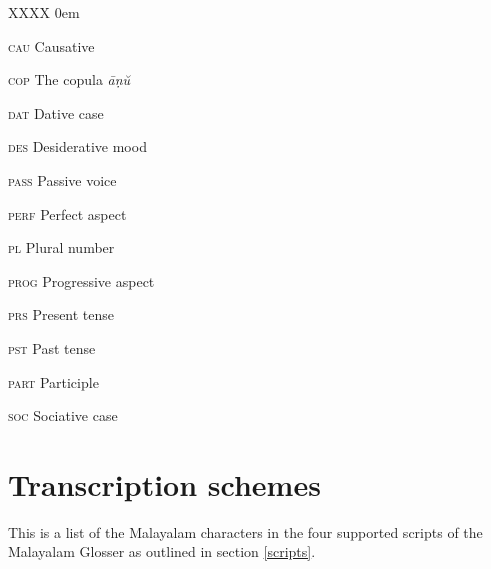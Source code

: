 \documentclass[a4paper]{article}
\begin{document}
\begin{multicols}{2}
\begin{labeling}{XXXX}
\itemsep0em
\item [\textsc{cau}] Causative
\item [\textsc{cop}] The copula \textit{āṇŭ}
\item [\textsc{dat}] Dative case
\item [\textsc{des}] Desiderative mood
\item [\textsc{pass}] Passive voice
\item [\textsc{perf}] Perfect aspect
\item [\textsc{pl}] Plural number
\item [\textsc{prog}] Progressive aspect
\item [\textsc{prs}] Present tense
\item [\textsc{pst}] Past tense
\item [\textsc{part}] Participle
\item [\textsc{soc}] Sociative case
\end{labeling}
\end{multicols}

\section{Transcription schemes}

This is a list of the Malayalam characters in the four supported scripts of the Malayalam Glosser as outlined in section \ref{scripts}.
\end{document}
